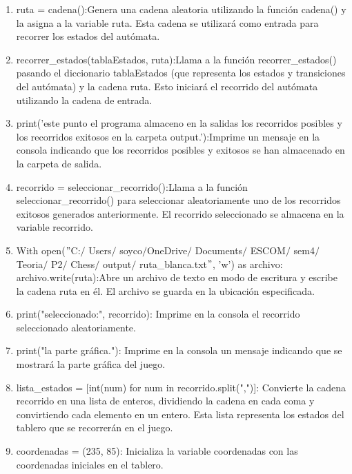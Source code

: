 \begin{enumerate}
\begin{enumerate}
    \begin{enumerate}
        \item ruta = cadena():Genera una cadena aleatoria utilizando la función cadena() y la asigna a la variable ruta. Esta cadena se utilizará como entrada para recorrer los estados del autómata.
        \item recorrer\_estados(tablaEstados, ruta):Llama a la función recorrer\_estados() pasando el diccionario tablaEstados (que representa los estados y transiciones del autómata) y la cadena ruta. Esto iniciará el recorrido del autómata utilizando la cadena de entrada.\newline
        \item print('\nEn este punto el programa almaceno en la salidas los recorridos posibles y los recorridos exitosos en la carpeta output.\n'):Imprime un mensaje en la consola indicando que los recorridos posibles y exitosos se han almacenado en la carpeta de salida.\newline
        \item recorrido = seleccionar\_recorrido():Llama a la función seleccionar\_recorrido() para seleccionar aleatoriamente uno de los recorridos exitosos generados anteriormente. El recorrido seleccionado se almacena en la variable recorrido.\newline
        \item With open($"$C:$/$ Users$/$ soyco$/$OneDrive$/$ Documents$/$ ESCOM$/$ sem4$/$ Teoria$/$ P2$/$ Chess$/$ output$/$ ruta\_blanca.txt$"$, 'w') as archivo: archivo.write(ruta):Abre un archivo de texto en modo de escritura y escribe la cadena ruta en él. El archivo se guarda en la ubicación especificada.\newline
        \item print("\nRecorrido seleccionado:", recorrido): Imprime en la consola el recorrido seleccionado aleatoriamente.\newline
        \item print("\nVea la parte gráfica."): Imprime en la consola un mensaje indicando que se mostrará la parte gráfica del juego.\newline
        \item lista\_estados = [int(num) for num in recorrido.split(",")]: Convierte la cadena recorrido en una lista de enteros, dividiendo la cadena en cada coma y convirtiendo cada elemento en un entero. Esta lista representa los estados del tablero que se recorrerán en el juego.\newline
        \item coordenadas = (235, 85): Inicializa la variable coordenadas con las coordenadas iniciales en el tablero.\newline

\end{enumerate}
\end{enumerate}
\end{enumerate}
